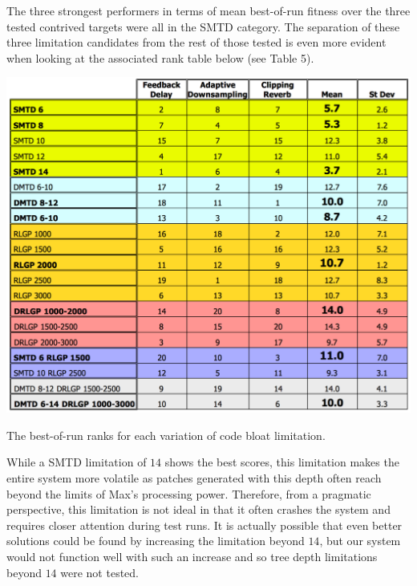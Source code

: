 \documentclass[12pt]{report} 	%
\numberwithin{figure}{chapter}
\numberwithin{table}{chapter}
\numberwithin{equation}{chapter}
\begin{document}
\begin{flushleft}
The three strongest performers in terms of mean best-of-run fitness over the three tested contrived targets were all in the SMTD category. The separation of these three limitation candidates from the rest of those tested is even more evident when looking at the associated rank table below (see Table 5).
\begin{table}[h!]
\begin{center}
\includegraphics[scale=0.6,width=\linewidth]{ResourceLimTable2}
\caption[Code bloat limitation best-of-run ranks]{The best-of-run ranks for each variation of code bloat limitation.}
\end{center}
\end{table}

While a SMTD limitation of $14$ shows the best scores, this limitation makes the entire system more volatile as patches generated with this depth often reach beyond the limits of Max's processing power. Therefore, from a pragmatic perspective, this limitation is not ideal in that it often crashes the system and requires closer attention during test runs. It is actually possible that even better solutions could be found by increasing the limitation beyond $14$, but our system would not function well with such an increase and so tree depth limitations beyond $14$ were not tested.


\end{flushleft}
\end{document}
